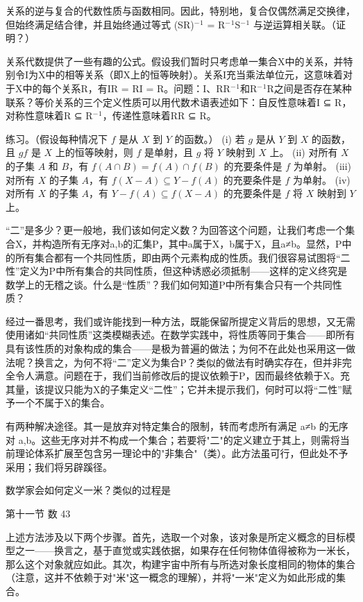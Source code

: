 \documentclass[12pt,a4paper]{ctexbook}
\theoremstyle{definition}
\theoremstyle{remark}
\begin{document}
{关系的逆与复合的代数性质与函数相同。因此，特别地，复合仅偶然满足交换律，但始终满足结合律，并且始终通过等式 (SR)$^{-}$$^{1}$ = R$^{-}$$^{1}$S$^{-}$$^{1}$ 与逆运算相关联。（证明？）

关系代数提供了一些有趣的公式。假设我们暂时只考虑单一集合X中的关系，并特别令I为X中的相等关系（即X上的恒等映射）。关系I充当乘法单位元，这意味着对于X中的每个关系R，有IR = RI = R。问题：I、RR$^{-}$$^{1}$和R$^{-}$$^{1}$R之间是否存在某种联系？等价关系的三个定义性质可以用代数术语表述如下：自反性意味着I ⊆ R，对称性意味着R ⊆ R$^{-}$$^{1}$，传递性意味着RR ⊆ R。

练习。（假设每种情况下 \( f \) 是从 \( X \) 到 \( Y \) 的函数。） (i) 若 \( g \) 是从 \( Y \) 到 \( X \) 的函数，且 \( gf \) 是 \( X \) 上的恒等映射，则 \( f \) 是单射，且 \( g \) 将 \( Y \) 映射到 \( X \) 上。 (ii) 对所有 \( X \) 的子集 \( A \) 和 \( B \)，有 \( f(A \cap B) = f(A) \cap f(B) \) 的充要条件是 \( f \) 为单射。 (iii) 对所有 \( X \) 的子集 \( A \)，有 \( f(X - A) \subseteq Y - f(A) \) 的充要条件是 \( f \) 为单射。 (iv) 对所有 \( X \) 的子集 \( A \)，有 \( Y - f(A) \subseteq f(X - A) \) 的充要条件是 \( f \) 将 \( X \) 映射到 \( Y \) 上。

“二”是多少？更一般地，我们该如何定义数？为回答这个问题，让我们考虑一个集合X，并构造所有无序对{a,b}的汇集P，其中a属于X，b属于X，且a≠b。显然，P中的所有集合都有一个共同性质，即由两个元素构成的性质。我们很容易试图将“二性”定义为P中所有集合的共同性质，但这种诱惑必须抵制——这样的定义终究是数学上的无稽之谈。什么是“性质”？我们如何知道P中所有集合只有一个共同性质？

经过一番思考，我们或许能找到一种方法，既能保留所提定义背后的思想，又无需使用诸如“共同性质”这类模糊表述。在数学实践中，将性质等同于集合——即所有具有该性质的对象构成的集合——是极为普遍的做法；为何不在此处也采用这一做法呢？换言之，为何不将“二”定义为集合P？类似的做法有时确实存在，但并非完全令人满意。问题在于，我们当前修改后的提议依赖于P，因而最终依赖于X。充其量，该提议只能为X的子集定义“二性”；它并未提示我们，何时可以将“二性”赋予一个不属于X的集合。

有两种解决途径。其一是放弃对特定集合的限制，转而考虑所有满足 a≠b 的无序对 {a,b}。这些无序对并不构成一个集合；若要将"二"的定义建立于其上，则需将当前理论体系扩展至包含另一理论中的"非集合"（类）。此方法虽可行，但此处不予采用；我们将另辟蹊径。

数学家会如何定义一米？类似的过程是

第十一节 数 43

上述方法涉及以下两个步骤。首先，选取一个对象，该对象是所定义概念的目标模型之一——换言之，基于直觉或实践依据，如果存在任何物体值得被称为一米长，那么这个对象就应如此。其次，构建宇宙中所有与所选对象长度相同的物体的集合（注意，这并不依赖于对"米"这一概念的理解），并将"一米"定义为如此形成的集合。

}
\end{document}
